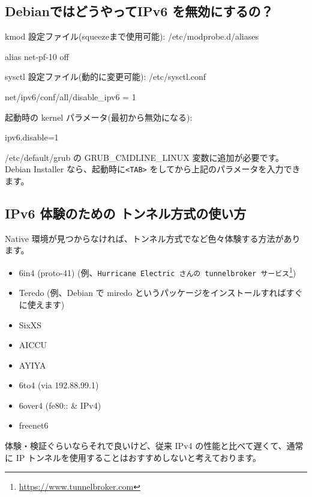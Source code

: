 \documentclass[mingoth,a4paper]{jsarticle}
\begin{document}
\subsection{DebianではどうやってIPv6 を無効にするの？}
kmod 設定ファイル(squeezeまで使用可能): /etc/modprobe.d/aliases
\begin{commandline}
alias net-pf-10 off
\end{commandline}
sysctl 設定ファイル(動的に変更可能): /etc/sysctl.conf
\begin{commandline}
net/ipv6/conf/all/disable_ipv6 = 1
\end{commandline}
起動時の kernel パラメータ(最初から無効になる): 
\begin{commandline}
ipv6.disable=1
\end{commandline}
/etc/default/grub の GRUB\_CMDLINE\_LINUX 変数に追加が必要です。
Debian Installer なら、起動時に\verb|<TAB>| をしてから上記のパラメータを入力できます。
\\
\subsection{IPv6 体験のための トンネル方式の使い方}
Native 環境が見つからなければ、トンネル方式でなど色々体験する方法があります。
\begin{itemize}
		\item 6in4 (proto-41) (例、{\tt Hurricane Electric さんの tunnelbroker サービス}\footnote{\url{https://www.tunnelbroker.com}})
\item Teredo (例、Debian で miredo というパッケージをインストールすればすぐに使えます)
\item SixXS
\item AICCU
\item AYIYA
\item 6to4 (via 192.88.99.1)
\item 6over4 (fe80:: \& IPv4)
\item freenet6
\end{itemize}
体験・検証ぐらいならそれで良いけど、従来 IPv4 の性能と比べて遅くて、通常に IP トンネルを使用することはおすすめしないと考えております。
\end{document}
